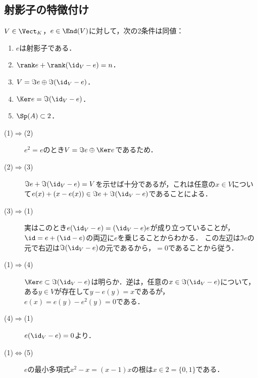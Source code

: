 \documentclass[uplatex, dvipdfmx]{jsreport}
\begin{document}
\subsection{射影子の特徴付け}

\begin{proposition}[冪等自己準同型の特徴付け]\label{prop-characterization-of-projector}
    $V\in\Vect_K$，$e\in\End(V)$に対して，次の2条件は同値：
    \begin{enumerate}
        \item $e$は射影子である．
        \item $\rank e+\rank(\id_V-e)=n$．
        \item $V=\Im e\oplus\Im(\id_V-e)$．
        \item $\Ker e=\Im(\id_V-e)$．
        \item $\Sp(A)\subset 2$．
    \end{enumerate}
\end{proposition}
\begin{Proof}\mbox{}
    \begin{description}
        \item[(1)$\Rightarrow$(2)] $e^2=e$のとき$V=\Im e\oplus\Ker e$であるため．
        \item[(2)$\Rightarrow$(3)] $\Im e+\Im(\id_V-e)=V$を示せば十分であるが，これは任意の$x\in V$について$e(x)+(x-e(x))\in\Im e+\Im(\id_V-e)$であることによる．
        \item[(3)$\Rightarrow$(1)] 実はこのとき$e(\id_V-e)=(\id_V-e)e$が成り立っていることが，$\id=e+(\id-e)$の両辺に$e$を乗じることからわかる．
        この左辺は$\Im e$の元で右辺は$\Im(\id_V-e)$の元であるから，$=0$であることから従う．
        \item[(1)$\Rightarrow$(4)] $\Ker e\subset\Im(\id_V-e)$は明らか．逆は，任意の$x\in\Im(\id_V-e)$について，ある$y\in V$が存在して$y-e(y)=x$であるが，$e(x)=e(y)-e^2(y)=0$である．
        \item[(4)$\Rightarrow$(1)] $e(\id_V-e)=0$より．
        \item[(1)$\Leftrightarrow$(5)] $e$の最小多項式$x^2-x=(x-1)x$の根は$x\in 2=\{0,1\}$である．
    \end{description}
\end{Proof}
\end{document}
